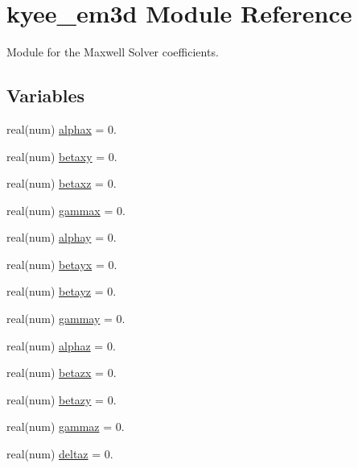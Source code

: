 \hypertarget{namespacekyee__em3d}{}\section{kyee\+\_\+em3d Module Reference}
\label{namespacekyee__em3d}


Module for the Maxwell Solver coefficients.  


\subsection*{Variables}
\begin{DoxyCompactItemize}
\item 
real(num) \hyperlink{namespacekyee__em3d_ac2a66c5c8d30bf6b7b48aea0657bf8bc}{alphax} = 0.
\item 
real(num) \hyperlink{namespacekyee__em3d_ae8a174dcda1cd460d69a96037af08fd2}{betaxy} = 0.
\item 
real(num) \hyperlink{namespacekyee__em3d_a1e5f96f2e02b45f24c52684bf13384b8}{betaxz} = 0.
\item 
real(num) \hyperlink{namespacekyee__em3d_af730f313af91da666568b7b5c38a6c51}{gammax} = 0.
\item 
real(num) \hyperlink{namespacekyee__em3d_aa2267c9b11a659a0462bfece7c0c2916}{alphay} = 0.
\item 
real(num) \hyperlink{namespacekyee__em3d_ac18e9a9e8cbb4229504331b7f282ac3c}{betayx} = 0.
\item 
real(num) \hyperlink{namespacekyee__em3d_afd94263eb5a367fedefa519ea52b097e}{betayz} = 0.
\item 
real(num) \hyperlink{namespacekyee__em3d_a2abb84b93c833164a253038ccfe8caf2}{gammay} = 0.
\item 
real(num) \hyperlink{namespacekyee__em3d_a47e844c257f4e614390c7ca29cce5f2c}{alphaz} = 0.
\item 
real(num) \hyperlink{namespacekyee__em3d_a35f1386b251e44934007765b790b6952}{betazx} = 0.
\item 
real(num) \hyperlink{namespacekyee__em3d_a3de51162fe948dd8a0de06489d7b20e5}{betazy} = 0.
\item 
real(num) \hyperlink{namespacekyee__em3d_a0a1131129b323f405033e0157a2cff2f}{gammaz} = 0.
\item 
real(num) \hyperlink{namespacekyee__em3d_aaa71d4d9190708dfbc55e561c8fa1712}{deltaz} = 0.
\end{DoxyCompactItemize}


